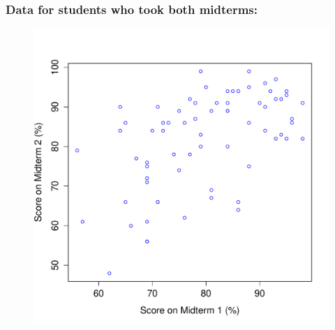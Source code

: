 \documentclass[handout]{beamer}
\begin{document}
\begin{frame}
\frametitle{Data for students who took both midterms:}
\begin{figure}
	\includegraphics[scale = 0.48]{./images/midterms0}
\end{figure}
\end{frame}
\end{document}
